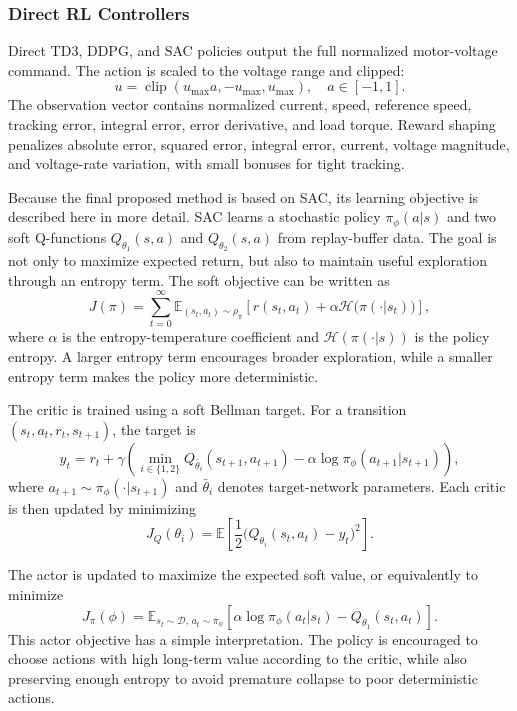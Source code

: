 \documentclass[conference]{IEEEtran}
\begin{document}
\subsubsection{Direct RL Controllers}
Direct TD3, DDPG, and SAC policies output the full normalized motor-voltage command. The action is scaled to the voltage range and clipped:
\begin{equation}
u = \operatorname{clip}(u_{\max}a, -u_{\max}, u_{\max}), \quad a \in [-1,1].
\end{equation}
The observation vector contains normalized current, speed, reference speed, tracking error, integral error, error derivative, and load torque. Reward shaping penalizes absolute error, squared error, integral error, current, voltage magnitude, and voltage-rate variation, with small bonuses for tight tracking.

Because the final proposed method is based on SAC, its learning objective is described here in more detail. SAC learns a stochastic policy $\pi_\phi(a|s)$ and two soft Q-functions $Q_{\theta_1}(s,a)$ and $Q_{\theta_2}(s,a)$ from replay-buffer data. The goal is not only to maximize expected return, but also to maintain useful exploration through an entropy term. The soft objective can be written as
\begin{equation}
J(\pi) = \sum_{t=0}^{\infty} \mathbb{E}_{(s_t,a_t)\sim \rho_\pi}
\left[
r(s_t,a_t) + \alpha \mathcal{H}\big(\pi(\cdot|s_t)\big)
\right],
\end{equation}
where $\alpha$ is the entropy-temperature coefficient and $\mathcal{H}(\pi(\cdot|s))$ is the policy entropy. A larger entropy term encourages broader exploration, while a smaller entropy term makes the policy more deterministic.

The critic is trained using a soft Bellman target. For a transition $(s_t,a_t,r_t,s_{t+1})$, the target is
\begin{equation}
y_t =
r_t + \gamma
\left(
\min_{i\in\{1,2\}} Q_{\bar{\theta}_i}(s_{t+1},a_{t+1})
- \alpha \log \pi_\phi(a_{t+1}|s_{t+1})
\right),
\end{equation}
where $a_{t+1} \sim \pi_\phi(\cdot|s_{t+1})$ and $\bar{\theta}_i$ denotes target-network parameters. Each critic is then updated by minimizing
\begin{equation}
J_Q(\theta_i) =
\mathbb{E}\left[
\frac{1}{2}\big(Q_{\theta_i}(s_t,a_t)-y_t\big)^2
\right].
\end{equation}

The actor is updated to maximize the expected soft value, or equivalently to minimize
\begin{equation}
J_\pi(\phi) =
\mathbb{E}_{s_t \sim \mathcal{D},\, a_t \sim \pi_\phi}
\left[
\alpha \log \pi_\phi(a_t|s_t) - Q_{\theta_1}(s_t,a_t)
\right].
\end{equation}
This actor objective has a simple interpretation. The policy is encouraged to choose actions with high long-term value according to the critic, while also preserving enough entropy to avoid premature collapse to poor deterministic actions.
\end{document}
